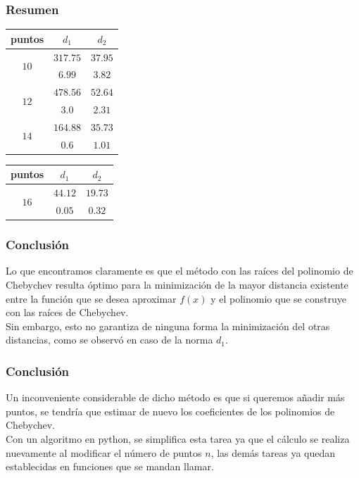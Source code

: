 \begin{frame}
\frametitle{Resumen}
\begin{minipage}[t]{0.4\textwidth}
\begin{table}
\fontsize{12}{12}\selectfont
\begin{tabular}{| c | c | c |} \hline
puntos & $d_{1}$ & $d_{2}$ \\\hline
\multirow{2}{*}{$10$} & $317.75$ & $37.95$ \\
    & $6.99$ & $3.82$ \\ \hline
    \multirow{2}{*}{$12$} & $478.56$ & $52.64$ \\
    & $3.0$ & $2.31$ \\ \hline 
    \multirow{2}{*}{$14$} & $164.88$ & $35.73$ \\
    & $0.6$ & $1.01$ \\ \hline
\end{tabular}
\end{table}
\end{minipage}
\hspace{1.5cm}
\begin{minipage}[t]{0.4\textwidth}
\begin{table}
\fontsize{12}{12}\selectfont
\begin{tabular}{| c | c | c |} \hline
puntos & $d_{1}$ & $d_{2}$ \\\hline
\multirow{2}{*}{$16$} & $44.12$ & $19.73$ \\
    & $0.05$ & $0.32$ \\ \hline
\end{tabular}
\end{table}
\end{minipage}
\end{frame}
\begin{frame}
\frametitle{Conclusión}
Lo que encontramos claramente es que el método con las raíces del polinomio de Chebychev resulta óptimo para la minimización de la mayor distancia existente entre la función que se desea aproximar $f(x)$ y el polinomio que se construye con las raíces de Chebychev.
\\
\bigskip
\pause
Sin embargo, esto no garantiza de ninguna forma la minimización del otras distancias, como se observó en caso de la norma $d_{1}$.
\end{frame}
\begin{frame}
\frametitle{Conclusión}
Un inconveniente considerable de dicho método es que si queremos añadir más puntos, se tendría que estimar de nuevo los coeficientes de los polinomios de Chebychev.
\\
\bigskip
\pause
Con un algoritmo en python, se simplifica esta tarea ya que el cálculo se realiza nuevamente al modificar el número de puntos $n$, las demás tareas ya quedan establecidas en funciones que se mandan llamar.
\end{frame}
